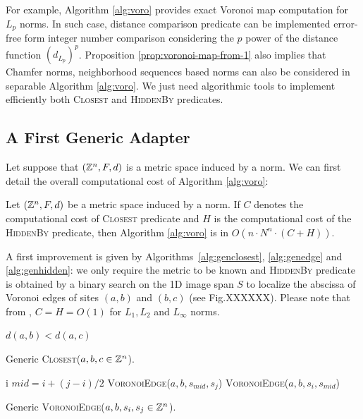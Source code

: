 \documentclass{llncs}
\begin{document}
For example, Algorithm \ref{alg:voro} provides exact Voronoi map
computation for $L_p$ norms. In such case, distance comparison
predicate can be implemented error-free form integer number comparison
considering the $p$ power of the distance function $\left
(d_{L_p}\right)^p$.  Proposition \ref{prop:voronoi-map-from-1} also
implies that Chamfer norms, neighborhood sequences based norms can
also be considered in separable Algorithm \ref{alg:voro}. We just need
algorithmic tools to implement efficiently both \textsc{Closest} and
\textsc{HiddenBy} predicates.

\subsection{A First Generic Adapter}
\label{sec:first-gener-adapt}

Let suppose that $({\mathbb{Z}}^n,F,d)$ is a metric space induced by a norm. We
can first detail the overall computational cost of Algorithm
\ref{alg:voro}:
\begin{lemma}
\label{lem:generic}
   Let $({\mathbb{Z}}^n, F, d)$ be a metric space induced by a norm. If $C$
  denotes the computational cost of \textsc{Closest} predicate and $H$
  is the computational cost of the \textsc{HiddenBy} predicate, then
  Algorithm \ref{alg:voro} is in   $O(n\cdot N^n\cdot (C+H))$.
\end{lemma}
A first improvement is given by Algorithms~\ref{alg:genclosest},
\ref{alg:genedge} and \ref{alg:genhidden}: we only require the metric
to be known and \textsc{HiddenBy} predicate is obtained by a binary
search on the 1D image span $S$ to localize the abscissa of Voronoi
edges of sites $(a,b)$ and $(b,c)$ (see Fig.XXXXXX). Please note that
from \cite{Breu1995,roerdnik}, $C=H=O(1)$ for $L_1,L_2$ and $L_\infty$
norms.



\begin{algorithm}[H]\footnotesize
  \Return $d(a,b) < d(a,c)$\;
  \caption{Generic \textsc{Closest}($a,b,c\in{\mathbb{Z}}^n$).\label{alg:genclosest}}
\end{algorithm}


\begin{algorithm}[H]\footnotesize
     {
       \Return  i
     }
     $mid  = i + (j-i)/2$\;
       {
         \Return \textsc{VoronoiEdge}($a,b,s_{mid},s_j$)
}
 {
         \Return \textsc{VoronoiEdge}($a,b,s_{i},s_{mid}$)
}

  \caption{Generic \textsc{VoronoiEdge}($a,b,s_i,s_j\in{\mathbb{Z}}^n$).\label{alg:genedge}}
\end{algorithm}
\end{document}
